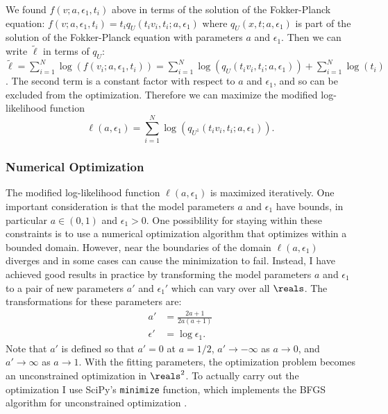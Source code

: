 We found $f(v; a, \epsilon_1, t_i)$ above in terms of the
solution of the Fokker-Planck equation:
$f(v; a, \epsilon_1, t_i) = t_i q_{U}(t_i v_i, t_i; a, \epsilon_1)$ where
$q_{U}(x, t; a, \epsilon_1)$ is part of the solution of the
Fokker-Planck equation with parameters $a$ and $\epsilon_1$. Then we can
write $\tilde{\ell}$ in terms of $q_{U}$:
$\tilde{\ell} = \sum_{i=1}^N \log(f(v_i; a, \epsilon_1, t_i)) = \sum_{i=1}^N
\log(q_{U}(t_i v_i, t_i; a, \epsilon_1)) + \sum_{i=1}^N \log(t_i)$. The
second term is a constant factor with respect to $a$ and $\epsilon_1$,
and so can be excluded from the optimization. Therefore we can
maximize the modified log-likelihood function
\begin{equation}
  \label{eq:mod-log-like}
  \ell(a, \epsilon_1) = \sum_{i=1}^N \log(q_{U^1}(t_i v_i, t_i; a, \epsilon_1)).
\end{equation}

\subsubsection{Numerical Optimization}
\label{sec:numer-optim}

The modified log-likelihood function $\ell(a, \epsilon_1)$ is maximized
iteratively. One important consideration is that the model parameters
$a$ and $\epsilon_1$ have bounds, in particular $a \in (0, 1)$ and
$\epsilon_1 > 0$. One possiblility for staying within these constraints
is to use a numerical optimization algorithm that optimizes within a
bounded domain. However, near the boundaries of the domain
$\ell(a, \epsilon_1)$ diverges and in some cases can cause the
minimization to fail. Instead, I have achieved good results in
practice by transforming the model parameters $a$ and $\epsilon_1$ to a
pair of new parameters $a'$ and $\epsilon_1'$ which can vary over all
$\reals$. The transformations for these parameters are:
\begin{align}
  \label{eq:a-fwd-trns}
  a' &= \frac{2a + 1}{2a(a + 1)} \\
  \label{eq:e-fwd-trns}
  \epsilon' &= \log \epsilon_1.
\end{align}
Note that $a'$ is defined so that $a'=0$ at $a=1/2$,
$a' \rightarrow -\infty$ as $a \rightarrow 0$, and
$a' \rightarrow \infty$ as $a \rightarrow 1$. With the fitting
parameters, the optimization problem becomes an unconstrained
optimization in $\reals^2$. To actually carry out the optimization I
use SciPy's \cite{Virtanen2020} \verb|minimize| function, which
implements the BFGS algorithm for unconstrained optimization
\cite{Nocedal2006}.

